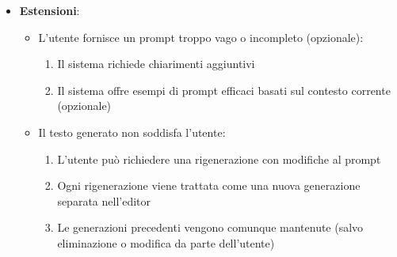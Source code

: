 \documentclass[11pt,a4paper]{article}
\begin{document}
\begin{itemize}
\begin{itemize}
\begin{enumerate}
                    \item colore del testo generato diverso dal colore del testo dell’utente (opzionale)
                \end{enumerate}
            \item L'utente può modificare il testo generato
        \end{itemize}
    \item \textbf{Estensioni}:
        \begin{itemize}
            \item L'utente fornisce un prompt troppo vago o incompleto (opzionale):
                \begin{enumerate}
                    \item Il sistema richiede chiarimenti aggiuntivi
                    \item Il sistema offre esempi di prompt efficaci basati sul contesto corrente (opzionale)
                \end{enumerate}
            \item Il testo generato non soddisfa l'utente:
                \begin{enumerate}
                    \item L'utente può richiedere una rigenerazione con modifiche al prompt
                    \item Ogni rigenerazione viene trattata come una nuova generazione separata nell'editor
                    \item Le generazioni precedenti vengono comunque mantenute (salvo eliminazione o modifica da parte dell'utente)
                \end{enumerate}
        \end{itemize}
\end{itemize}
\end{document}
